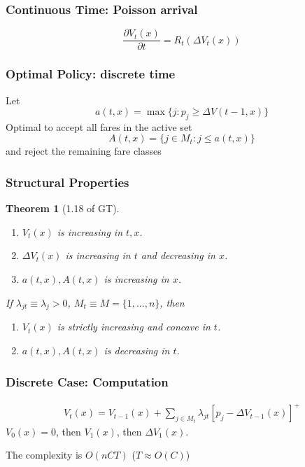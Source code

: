 \documentclass[11pt,a4paper]{article}
\newtheorem{theorem}{Theorem}
\begin{document}
\subsubsection{Continuous Time: Poisson arrival}
$$\frac{\partial V_t(x)}{\partial t}=R_t(\Delta V_t(x))$$

\subsubsection{Optimal Policy: discrete time}
Let $$a(t,x)=\max\{j:p_j\geq \Delta V(t-1,x)\}$$
Optimal to accept all fares in the active set
$$A(t,x)=\{j\in M_t: j\leq a(t,x)\}$$
and reject the remaining fare classes

\subsubsection{Structural Properties}
\begin{theorem}[1.18 of GT]
\quad

\begin{enumerate}[$\bullet$]
    \item $V_t(x)$ is increasing in $t,x$.
    \item $\Delta V_t(x)$ is increasing in $t$ and decreasing in $x$.
    \item $a(t,x),A(t,x)$ is increasing in $x$.
\end{enumerate}
If $\lambda_{jt}\equiv \lambda_j>0$, $M_t\equiv M=\{1,...,n\}$, then
\begin{enumerate}[$\bullet$]
    \item $V_t(x)$ is strictly increasing and concave in $t$.
    \item $a(t,x),A(t,x)$ is decreasing in $t$.
\end{enumerate}
\end{theorem}

\subsubsection{Discrete Case: Computation}
\begin{equation}
    \begin{aligned}
        V_t(x)=V_{t-1}(x)+\sum_{j\in M_t}\lambda_{jt}[p_j-\Delta V_{t-1}(x)]^+
    \end{aligned}
    \nonumber
\end{equation}
$V_0(x)=0$, then $V_1(x)$, then $\Delta V_1(x)$.

The complexity is $O(nC T)$ ($T \approx O(C)$)
\end{document}
